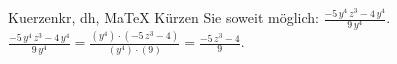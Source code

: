 \begin{MAufgabe}{Kuerzen}{kr, dh, MaTeX}
K\"urzen Sie soweit m\"oglich: $\frac{ - 5\, y^4\, z^3 - 4\, y^4}{9\, y^4}$.\\ 
\ifLsg\MLoesung
\quad $\frac{ - 5\, y^4\, z^3 - 4\, y^4}{9\, y^4}=\frac{(y^4)\cdot( - 5\, z^3 - 4)}{(y^4)\cdot(9)}=\frac{ - 5\, z^3 - 4}{9}$.\else\relax\fi
 \end{MAufgabe}